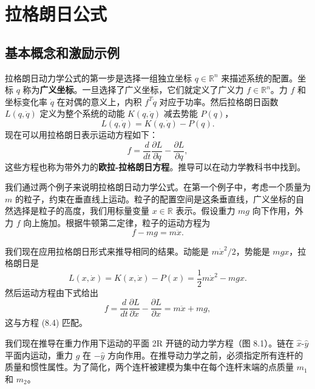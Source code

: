 \documentclass[12pt,a4paper]{article}
\begin{document}
\section{拉格朗日公式}
\subsection{基本概念和激励示例}

拉格朗日动力学公式的第一步是选择一组独立坐标 $q \in \mathbb{R}^n$ 来描述系统的配置。坐标 $q$ 称为\textbf{广义坐标}。一旦选择了广义坐标，它们就定义了广义力 $f \in \mathbb{R}^n$。力 $f$ 和坐标变化率 $\dot{q}$ 在对偶的意义上，内积 $f^T \dot{q}$ 对应于功率。然后拉格朗日函数 $L(q, \dot{q})$ 定义为整个系统的动能 $K(q, \dot{q})$ 减去势能 $P(q)$，
\begin{equation}
L(q, \dot{q}) = K(q, \dot{q}) - P(q).
\end{equation}
现在可以用拉格朗日表示运动方程如下：
\begin{equation}
f = \frac{d}{dt}\frac{\partial L}{\partial \dot{q}} - \frac{\partial L}{\partial q}, \label{eq:8.3}
\end{equation}
这些方程也称为带外力的\textbf{欧拉-拉格朗日方程}。推导可以在动力学教科书中找到。

我们通过两个例子来说明拉格朗日动力学公式。在第一个例子中，考虑一个质量为 $m$ 的粒子，约束在垂直线上运动。粒子的配置空间是这条垂直线，广义坐标的自然选择是粒子的高度，我们用标量变量 $x \in \mathbb{R}$ 表示。假设重力 $mg$ 向下作用，外力 $f$ 向上施加。根据牛顿第二定律，粒子的运动方程为
\begin{equation}
f - mg = m\ddot{x}. \label{eq:8.4}
\end{equation}

我们现在应用拉格朗日形式来推导相同的结果。动能是 $m\dot{x}^2/2$，势能是 $mgx$，拉格朗日是
\begin{equation}
L(x, \dot{x}) = K(x, \dot{x}) - P(x) = \frac{1}{2}m\dot{x}^2 - mgx. \label{eq:8.5}
\end{equation}
然后运动方程由下式给出
\begin{equation}
f = \frac{d}{dt}\frac{\partial L}{\partial \dot{x}} - \frac{\partial L}{\partial x} = m\ddot{x} + mg, \label{eq:8.6}
\end{equation}
这与方程 (8.4) 匹配。

我们现在推导在重力作用下运动的平面 2R 开链的动力学方程（图 8.1）。链在 $\hat{x}$-$\hat{y}$ 平面内运动，重力 $g$ 在 $-\hat{y}$ 方向作用。在推导动力学之前，必须指定所有连杆的质量和惯性属性。为了简化，两个连杆被建模为集中在每个连杆末端的点质量 $m_1$ 和 $m_2$。
\end{document}

